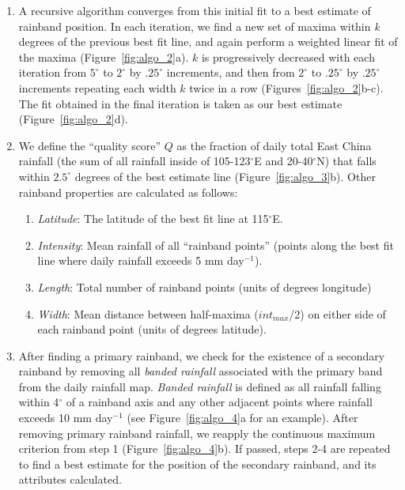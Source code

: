\documentclass[9pt,twocolumn,twoside,lineno]{pnas-new}
\begin{document}
\begin{enumerate}
	\item A recursive algorithm converges from this initial fit to a best estimate of rainband position. In each iteration, we find a new set of maxima within \textit{k} degrees of the previous best fit line, and again perform a weighted linear fit of the maxima (Figure~\ref{fig:algo_2}a). $k$ is progressively decreased with each iteration from $5^{\circ}$ to $2^{\circ}$ by $.25^{\circ}$ increments, and then from $2^{\circ}$ to $.25^{\circ}$ by $.25^{\circ}$ increments repeating each width $k$ twice in a row (Figures~\ref{fig:algo_2}b-c). The fit obtained in the final iteration is taken as our best estimate (Figure~\ref{fig:algo_2}d).
	
	\item We define the ``quality score'' $Q$ as the fraction of daily total East China rainfall (the sum of all rainfall inside of 105-123$^{\circ}$E and 20-40$^{\circ}$N) that falls within $2.5^{\circ}$ degrees of the best estimate line (Figure~\ref{fig:algo_3}b). Other rainband properties are calculated as follows:
	
	 \begin{enumerate}
	 
	 	\item \textit{Latitude}: The latitude of the best fit line at 115$^{\circ}$E. 
	 
	 	\item \textit{Intensity}: Mean rainfall of all ``rainband points'' (points along the best fit line where daily rainfall exceeds 5 mm day$^{-1}$).
	 
	 	\item \textit{Length}: Total number of rainband points (units of degrees longitude)
	 
	 	\item \textit{Width}: Mean distance between half-maxima ($int_{max}$/2) on either side of each rainband point (units of degrees latitude).
	 
	 \end{enumerate}
	
	\item After finding a primary rainband, we check for the existence of a secondary rainband by removing all \textit{banded rainfall} associated with the primary band from the daily rainfall map. \textit{Banded rainfall} is defined as all rainfall falling within 4$^{\circ}$ of a rainband axis and any other adjacent points where rainfall exceeds 10 mm day$^{-1}$ (see Figure~\ref{fig:algo_4}a for an example). After removing primary rainband rainfall, we reapply the continuous maximum criterion from step 1 (Figure~\ref{fig:algo_4}b). If passed, steps 2-4 are repeated to find a best estimate for the position of the secondary rainband, and its attributes calculated.
	

\end{enumerate}
\end{document}
